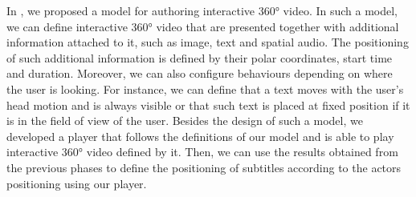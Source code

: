 In \cite{mendes2020authoring}, we proposed a model for authoring interactive 360° video. In such a model, we can define interactive 360° video that are presented together with additional information attached to it, such as image, text and spatial audio. The positioning of such additional information is defined by their polar coordinates, start time and duration. Moreover, we can also configure behaviours depending on where the user is looking. For instance, we can define that a text moves with the user's head motion and is always visible or that such text is placed at fixed position if it is in the field of view of the user. Besides the design of such a model, we developed a player that follows the definitions of our model and is able to play interactive 360° video defined by it. Then, we can use the results obtained from the previous phases to define the positioning of subtitles according to the actors positioning using our player.